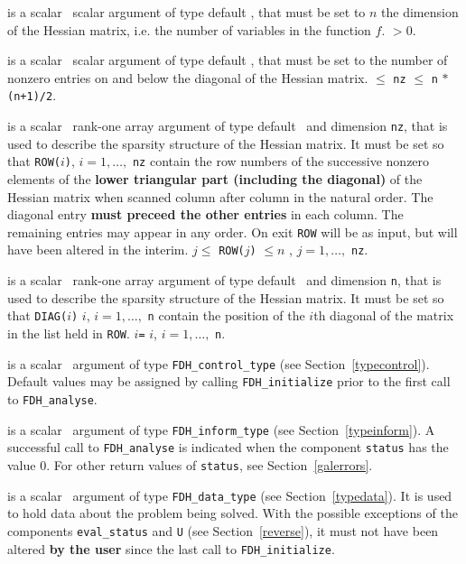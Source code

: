 \documentclass{galahad}
\newcommand{\packagename}{FDH}
\begin{document}
\vspace*{-2mm}
\begin{description}
is a scalar \intentin\ scalar argument of type default \integer, that must be
set to $n$ the dimension of the Hessian matrix, i.e. the number of
variables in the function $f$.
 $> 0$.

is a scalar \intentin\ scalar argument of type default \integer, that must be
set to the number of nonzero entries on and below the diagonal of the Hessian
matrix.
 $\le$ {\tt nz} $\le$ {\tt n} $\ast$ {\tt (n+1)/2}.

 is a scalar \intentinout\ rank-one array argument of type
default \integer\ and dimension {\tt nz}, that is used to describe
the sparsity structure of the Hessian matrix. It must be set so that
 {\tt ROW(}$i${\tt)}, $i = 1, \ldots,$ {\tt nz} contain the row
numbers of the successive nonzero elements of the {\bf lower triangular part
(including the diagonal)} of the Hessian matrix when scanned column after
column in the natural order. The diagonal entry
{\bf must preceed the other entries} in each column. The remaining entries
may appear in any order. On exit {\tt ROW} will be as input, but will have
been altered in the interim.
\restrictions
$j \leq$ {\tt ROW(}$j${\tt)} $\leq n$ , $j = 1, \ldots,$ {\tt nz}.

is a scalar \intentin\ rank-one array argument of type
default \integer\ and dimension {\tt n}, that is used to describe
the sparsity structure of the Hessian matrix. It must be set so that
 {\tt DIAG(}$i${\tt)} $i$, $i = 1, \ldots,$ {\tt n}
contain the position of the $i$th diagonal of the matrix in the list held
in {\tt ROW}.
$i${\tt=} $i$, $i = 1, \ldots,$ {\tt n}.

 is a scalar \intentin\ argument of type
{\tt \packagename\_control\_type}
(see Section~\ref{typecontrol}). Default values may be assigned by calling
{\tt \packagename\_initialize} prior to the first call to
{\tt \packagename\_analyse}.

 is a scalar \intentinout\ argument of type
{\tt \packagename\_inform\_type}
(see Section~\ref{typeinform}).
A successful call to
{\tt \packagename\_analyse}
is indicated when the  component {\tt status} has the value 0.
For other return values of {\tt status}, see Section~\ref{galerrors}.

 is a scalar \intentinout\ argument of type
{\tt \packagename\_data\_type}
(see Section~\ref{typedata}). It is used to hold data about the problem being
solved. With the possible exceptions of the components
{\tt eval\_status} and {\tt U} (see Section~\ref{reverse}),
it must not have been altered {\bf by the user} since the last call to
{\tt \packagename\_initialize}.

\end{description}
\end{document}
